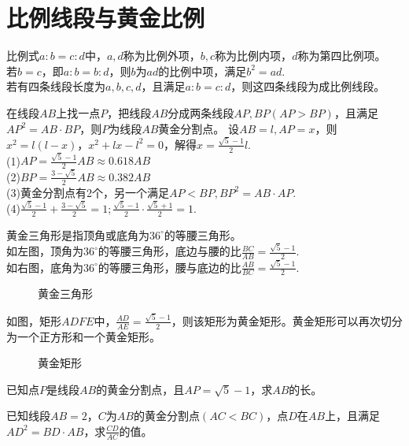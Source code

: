 \section{比例线段与黄金比例}
\begin{theorem}
    比例式$a:b=c:d$中，$a,d$称为比例外项，$b,c$称为比例内项，$d$称为第四比例项。\\
    若$b=c$，即$a:b=b:d$，则$b$为$ad$的比例中项，满足$b^2=ad$. \\
    若有四条线段长度为$a,b,c,d$，且满足$a:b=c:d$，则这四条线段为成比例线段。
\end{theorem}
\begin{theorem}
    在线段$AB$上找一点$P$，把线段$AB$分成两条线段$AP,BP(AP>BP)$，且满足$AP^2=AB·BP$，则$P$为线段$AB$黄金分割点。
    设$AB=l,AP=x$，则$x^2=l(l-x)$，$x^2+lx-l^2=0$，解得$x=\frac{\sqrt5-1}{2}l$.\\
    (1)$AP=\frac{\sqrt5 - 1}{2}AB \approx 0.618AB$ \\
    (2)$BP=\frac{3 - \sqrt5}{2}AB \approx 0.382AB$ \\
    (3)黄金分割点有2个，另一个满足$AP<BP,BP^2=AB·AP.$ \\
    (4)$\frac{\sqrt5-1}{2}+\frac{3-\sqrt5}{2}=1;\frac{\sqrt5-1}{2}·\frac{\sqrt5+1}{2}=1$.
\end{theorem}
\begin{definition}
    黄金三角形是指顶角或底角为$36^\circ$的等腰三角形。\\
    如左图，顶角为$36^\circ$的等腰三角形，底边与腰的比$\frac{BC}{AB}=\frac{\sqrt5-1}{2}$. \\
    如右图，底角为$36^\circ$的等腰三角形，腰与底边的比$\frac{AB}{BC}=\frac{\sqrt5-1}{2}$.
\end{definition}
\begin{figure}[H]
    \centering
    \resizebox{6cm}{!}{}
    \caption{黄金三角形}
\end{figure}
\begin{definition}
    如图，矩形$ADFE$中，$\frac{AD}{AE}=\frac{\sqrt5-1}{2}$，则该矩形为黄金矩形。黄金矩形可以再次切分为一个正方形和一个黄金矩形。
\end{definition}
\begin{figure}[H]
    \centering
    \resizebox{4cm}{!}{}
    \caption{黄金矩形}
\end{figure}
\begin{problem}
已知点$P$是线段$AB$的黄金分割点，且$AP=\sqrt5-1$，求$AB$的长。
\end{problem}
\begin{problem}
已知线段$AB=2$，$C$为$AB$的黄金分割点$(AC<BC)$，点$D$在$AB$上，且满足$AD^2=BD·AB$，求$\frac{CD}{AC}$的值。
\end{problem}
\clearpage
